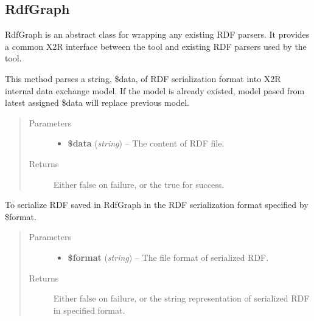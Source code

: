 \documentclass[letterpaper,10pt,english]{sphinxmanual}
\begin{document}
\subsection{RdfGraph}
\label{docs/api:rdfgraph}

\begin{fulllineitems}
\label{docs/api:RdfGraph}
RdfGraph is an abstract class for wrapping any existing RDF parsers. It provides a common X2R interface between the tool and existing RDF parsers used by the tool.

\begin{fulllineitems}
\label{docs/api:RdfGraph::parseRdf}
This method parses a string, \$data, of RDF serialization format into X2R internal data exchange model. If the model is already existed, model pased from latest assigned \$data will replace previous model.
\begin{quote}\begin{description}
\item[{Parameters}] \leavevmode\begin{itemize}
\item {} 
\textbf{\$data} (\emph{string}) -- The content of RDF file.

\end{itemize}

\item[{Returns}] \leavevmode
Either false on failure, or the true for success.

\end{description}\end{quote}

\end{fulllineitems}


\begin{fulllineitems}
\label{docs/api:RdfGraph::serializeRdfAs}
To serialize RDF saved in RdfGraph in the RDF serialization format specified by \$format.
\begin{quote}\begin{description}
\item[{Parameters}] \leavevmode\begin{itemize}
\item {} 
\textbf{\$format} (\emph{string}) -- The file format of serialized RDF.

\end{itemize}

\item[{Returns}] \leavevmode
Either false on failure, or the string representation of serialized RDF in specified format.

\end{description}\end{quote}

\end{fulllineitems}


\end{fulllineitems}
\end{document}

